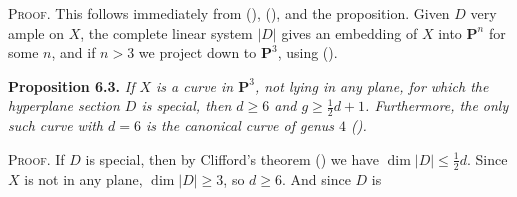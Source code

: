 {\smallskip
\noindent\textsc{Proof.} This follows immediately from (), (), and the proposition. Given $D$ very ample on $X$, the complete linear system $|D|$ gives an embedding of $X$ into $\mathbf P^n$ for some $n$, and if $n>3$ we project down to $\mathbf P^3$, using ().

\medskip
\noindent\hypertarget{result-IV-6.3}{}\textbf{Proposition 6.3.} \emph{If $X$ is a curve in $\mathbf P^3$, not lying in any plane, for which the hyperplane section $D$ is special, then $d\ge6$ and $g\ge\frac12d+1$. Furthermore, the only such curve with $d=6$ is the canonical curve of genus $4$ ().}

\smallskip
\noindent\textsc{Proof.} If $D$ is special, then by Clifford's theorem () we have $\dim|D|\le\frac12d$. Since $X$ is not in any plane, $\dim|D|\ge3$, so $d\ge6$. And since $D$ is}
